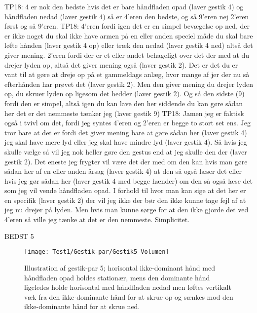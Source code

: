TP18: 4 er nok den bedste hvis det er bare håndfladen opad (laver gestik 4) og håndfladen nedad (laver gestik 4) så er 4’eren den bedste, og så 9’eren nej 2’eren først og så 9’eren. 
TP18: 4’eren fordi igen det er en simpel bevægelse op ned, der er ikke noget du skal ikke have armen på en eller anden speciel måde du skal bare løfte hånden (laver gestik 4 op) eller træk den nedad (laver gestik 4 ned) altså det giver mening. 2’eren fordi der er et eller andet behageligt over det der med at du drejer lyden op, altså det giver mening også (laver gestik 2).  Det er det du er vant til at gøre at dreje op på et gammeldags anlæg, hvor mange af jer der nu så efterhånden har prøvet det (laver gestik 2). Men den giver mening du drejer lyden op, du skruer lyden op ligesom det hedder (laver gestik 2). Og så den sidste (9) fordi den er simpel, altså igen du kan lave den her siddende du kan gøre sådan her det er det nemmeste tænker jeg (laver gestik 9)
TP18:  Jamen jeg er faktisk også i tvivl om det, fordi jeg syntes 4’eren og 2’eren er begge to stort set ens. Jeg tror bare at det er fordi det giver mening bare at gøre sådan her (laver gestik 4) jeg skal have mere lyd eller jeg skal have mindre lyd (laver gestik 4). Så hvis jeg skulle vælge så vil jeg nok heller gøre den gestus end at jeg skulle den der (laver gestik 2). Det eneste jeg frygter vil være det der med om den kan hvis man gøre sådan her af en eller anden årsag (laver gestik 4) at den så også læser det eller hvis jeg gør sådan her (laver gestik 4 med begge hænder) om den så også læse det som jeg vil vende håndfladen opad. I forhold til hvor man kan sige at det her er en specifik (laver gestik 2) der vil jeg ikke der bør den ikke kunne tage fejl af at jeg nu drejer på lyden. Men hvis man kunne sørge for at den ikke gjorde det ved 4’eren så ville jeg tænke at det er den nemmeste. Simplicitet. 


 
BEDST 5 

%
\begin{figure}[H]
	\centering
	\texttt{[image: Test1/Gestik-par/Gestik5\_Volumen]}
	\caption{Illustration af gestik-par 5; horisontal ikke-dominant hånd med håndfladen opad holdes stationær, mens den dominante hånd ligeledes holde horisontal med håndfladen nedad men løftes vertikalt væk fra den ikke-dominante hånd for at skrue op og sænkes mod den ikke-dominante hånd for at skrue ned.}
	\label{fig:GestikPar5Volumen}
\end{figure}
\noindent
%

